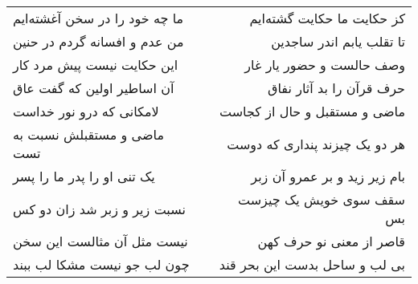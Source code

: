 \begin{center}
\begin{longtable}{l p{0.5cm} r}
ما چه خود را در سخن آغشته‌ایم
&&
کز حکایت ما حکایت گشته‌ایم
\\
من عدم و افسانه گردم در حنین
&&
تا تقلب یابم اندر ساجدین
\\
این حکایت نیست پیش مرد کار
&&
وصف حالست و حضور یار غار
\\
آن اساطیر اولین که گفت عاق
&&
حرف قرآن را بد آثار نفاق
\\
لامکانی که درو نور خداست
&&
ماضی و مستقبل و حال از کجاست
\\
ماضی و مستقبلش نسبت به تست
&&
هر دو یک چیزند پنداری که دوست
\\
یک تنی او را پدر ما را پسر
&&
بام زیر زید و بر عمرو آن زبر
\\
نسبت زیر و زبر شد زان دو کس
&&
سقف سوی خویش یک چیزست بس
\\
نیست مثل آن مثالست این سخن
&&
قاصر از معنی نو حرف کهن
\\
چون لب جو نیست مشکا لب ببند
&&
بی لب و ساحل بدست این بحر قند
\\
\end{longtable}
\end{center}
